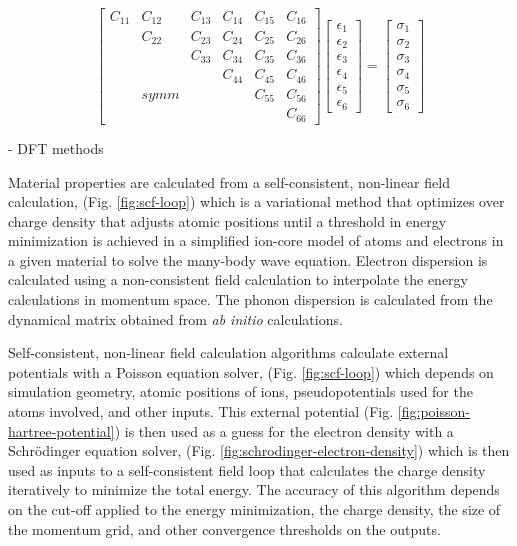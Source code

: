 \begin{equation} \label{eqn:stiffness-voigt-notation}
 \begin{bmatrix}
C_{11} & C_{12} & C_{13} & C_{14} & C_{15} & C_{16} \\
 & C_{22} & C_{23} & C_{24} & C_{25} & C_{26} \\
 &  & C_{33} & C_{34} & C_{35} & C_{36} \\
 &  &  & C_{44} & C_{45} & C_{46} \\
 & symm &  &  & C_{55} & C_{56} \\
 &  &  &  &  & C_{66} 
\end{bmatrix}  \begin{bmatrix}
\epsilon_{1} \\
\epsilon_{2} \\
\epsilon_{3} \\
\epsilon_{4} \\
\epsilon_{5} \\
\epsilon_{6} 
\end{bmatrix}  =  \begin{bmatrix}
\sigma_{1} \\
\sigma_{2} \\
\sigma_{3} \\
\sigma_{4} \\
\sigma_{5} \\
\sigma_{6} 
\end{bmatrix}  
\end{equation}


- DFT methods

Material properties are calculated from a self-consistent, non-linear field calculation, (Fig. \ref{fig:scf-loop}) which is a variational method that optimizes over charge density that adjusts atomic positions until a threshold in energy minimization is achieved in a simplified ion-core model of atoms and electrons in a given material to solve the many-body wave equation. \cite{Schwingenschloegl2004} Electron dispersion is calculated using a non-consistent field calculation to interpolate the energy calculations in momentum space. The phonon dispersion is calculated from the dynamical matrix obtained from \textit{ab initio} calculations. \cite{hung2022quantum, giustino2014materials}

Self-consistent, non-linear field calculation algorithms calculate external potentials with a Poisson equation solver, (Fig. \ref{fig:scf-loop}) which depends on simulation geometry, atomic positions of ions, pseudopotentials used for the atoms involved, and other inputs. This external potential (Fig. \ref{fig:poisson-hartree-potential}) is then used as a guess for the electron density with a Schr\"{o}dinger equation solver, (Fig. \ref{fig:schrodinger-electron-density}) which is then used as inputs to a self-consistent field loop that calculates the charge density iteratively to minimize the total energy. The accuracy of this algorithm depends on the cut-off applied to the energy minimization, the charge density, the size of the momentum grid, and other convergence thresholds on the outputs. \cite{hung2022quantum, Schwingenschloegl2004, giustino2014materials}

